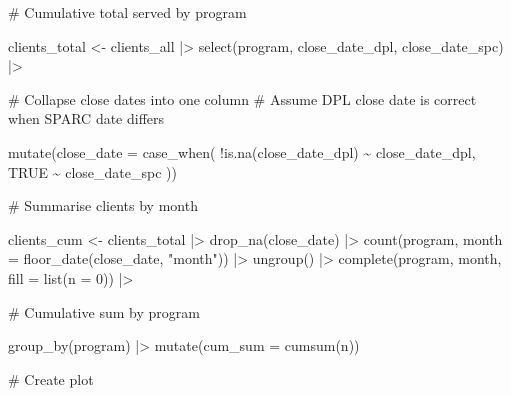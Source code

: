 \documentclass[
  letterpaper,
  DIV=11,
  numbers=noendperiod]{scrartcl}
\newenvironment{Shaded}{\begin{snugshade}}{\end{snugshade}}
\newcommand{\AttributeTok}[1]{\textcolor[rgb]{0.40,0.45,0.13}{#1}}
\newcommand{\CommentTok}[1]{\textcolor[rgb]{0.37,0.37,0.37}{#1}}
\newcommand{\ConstantTok}[1]{\textcolor[rgb]{0.56,0.35,0.01}{#1}}
\newcommand{\DecValTok}[1]{\textcolor[rgb]{0.68,0.00,0.00}{#1}}
\newcommand{\FunctionTok}[1]{\textcolor[rgb]{0.28,0.35,0.67}{#1}}
\newcommand{\NormalTok}[1]{\textcolor[rgb]{0.00,0.23,0.31}{#1}}
\newcommand{\OtherTok}[1]{\textcolor[rgb]{0.00,0.23,0.31}{#1}}
\newcommand{\SpecialCharTok}[1]{\textcolor[rgb]{0.37,0.37,0.37}{#1}}
\newcommand{\StringTok}[1]{\textcolor[rgb]{0.13,0.47,0.30}{#1}}
\begin{document}
\begin{Shaded}
\begin{Highlighting}[]
\CommentTok{\# Cumulative total served by program}

\NormalTok{clients\_total }\OtherTok{\textless{}{-}}\NormalTok{ clients\_all }\SpecialCharTok{|\textgreater{}} 
  \FunctionTok{select}\NormalTok{(program, close\_date\_dpl, close\_date\_spc) }\SpecialCharTok{|\textgreater{}} 
  
  \CommentTok{\# Collapse close dates into one column}
  \CommentTok{\# Assume DPL close date is correct when SPARC date differs}
  
  \FunctionTok{mutate}\NormalTok{(}\AttributeTok{close\_date =} \FunctionTok{case\_when}\NormalTok{(}
    \SpecialCharTok{!}\FunctionTok{is.na}\NormalTok{(close\_date\_dpl) }\SpecialCharTok{\textasciitilde{}}\NormalTok{ close\_date\_dpl,}
    \ConstantTok{TRUE} \SpecialCharTok{\textasciitilde{}}\NormalTok{ close\_date\_spc}
\NormalTok{  ))}
  
\CommentTok{\# Summarise clients by month}

\NormalTok{clients\_cum }\OtherTok{\textless{}{-}}\NormalTok{ clients\_total }\SpecialCharTok{|\textgreater{}} 
  \FunctionTok{drop\_na}\NormalTok{(close\_date) }\SpecialCharTok{|\textgreater{}}     
  \FunctionTok{count}\NormalTok{(program, }\AttributeTok{month =} \FunctionTok{floor\_date}\NormalTok{(close\_date, }\StringTok{"month"}\NormalTok{)) }\SpecialCharTok{|\textgreater{}} 
  \FunctionTok{ungroup}\NormalTok{() }\SpecialCharTok{|\textgreater{}} 
  \FunctionTok{complete}\NormalTok{(program, month, }\AttributeTok{fill =} \FunctionTok{list}\NormalTok{(}\AttributeTok{n =} \DecValTok{0}\NormalTok{)) }\SpecialCharTok{|\textgreater{}} 
  
  \CommentTok{\# Cumulative sum by program}
  
  \FunctionTok{group\_by}\NormalTok{(program) }\SpecialCharTok{|\textgreater{}}
  \FunctionTok{mutate}\NormalTok{(}\AttributeTok{cum\_sum =} \FunctionTok{cumsum}\NormalTok{(n))}
  
\CommentTok{\# Create plot}


\end{Highlighting}
\end{Shaded}
\end{document}
